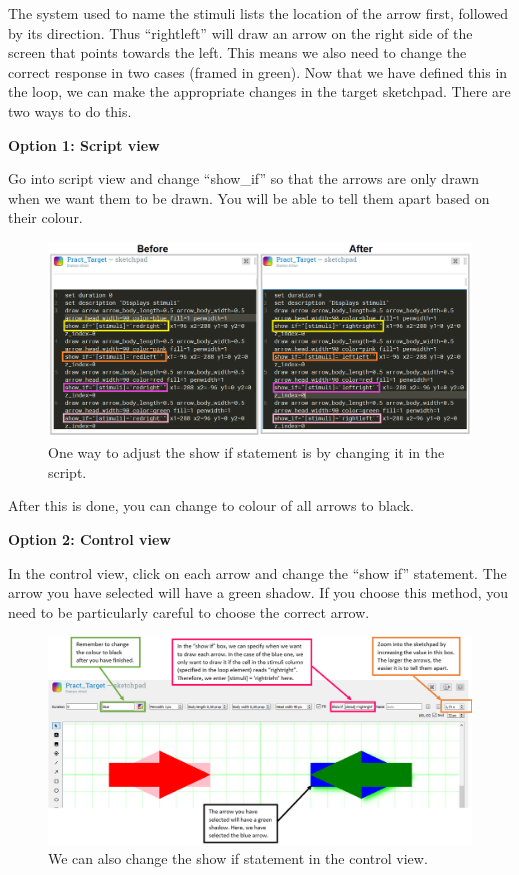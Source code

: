 \documentclass[
]{book}
\begin{document}
The system used to name the stimuli lists the location of the arrow first, followed by its direction. Thus ``rightleft'' will draw an arrow on the right side of the screen that points towards the left. This means we also need to change the correct response in two cases (framed in green). Now that we have defined this in the loop, we can make the appropriate changes in the target sketchpad. There are two ways to do this.

\textbf{Option 1: Script view}

Go into script view and change ``show\_if'' so that the arrows are only drawn when we want them to be drawn. You will be able to tell them apart based on their colour.

\begin{figure}

{\centering \includegraphics[width=0.99\linewidth]{images/changesimon/07script} 

}

\caption{One way to adjust the show if statement is by changing it in the script.}\label{fig:Figure3-13}
\end{figure}

After this is done, you can change to colour of all arrows to black.

\textbf{Option 2: Control view}

In the control view, click on each arrow and change the ``show if'' statement. The arrow you have selected will have a green shadow. If you choose this method, you need to be particularly careful to choose the correct arrow.

\begin{figure}

{\centering \includegraphics[width=0.99\linewidth]{images/changesimon/08option2} 

}

\caption{We can also change the show if statement in the control view.}\label{fig:Figure3-14}
\end{figure}
\end{document}
